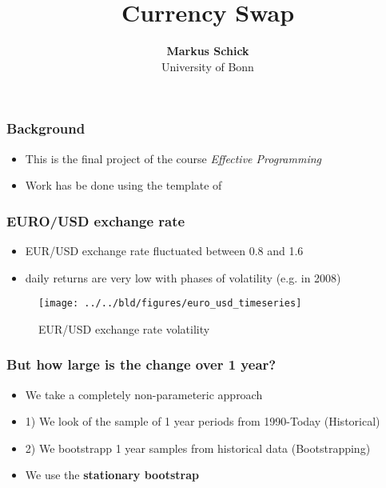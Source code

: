 \documentclass[11pt]{beamer}
\begin{document}
\title{Currency Swap}

\author[Markus Schick]
{
{\bf Markus Schick}\\
{\small University of Bonn}\\[1ex]
}


\begin{frame}
    \titlepage
    \note{~}
\end{frame}

\begin{frame}[t]
    \frametitle{Background}
    \begin{itemize}
        \item This is the final project of the course \textit{Effective Programming}
        \item Work has be done using the template of \citet{GaudeckerEconProjectTemplates}
    \end{itemize}
    \note{~}
\end{frame}



\begin{frame}[t]
    \frametitle{EURO/USD exchange rate}
    \begin{itemize}
        \item EUR/USD exchange rate fluctuated between 0.8 and 1.6
        \item daily returns are very low with phases of volatility (e.g. in 2008)
    \end{itemize}
    \begin{figure}
        \caption{EUR/USD exchange rate volatility}
        \texttt{[image: ../../bld/figures/euro\_usd\_timeseries]}
    \end{figure}
    \note{~}
\end{frame}

\begin{frame}[t]
    \frametitle{But how large is the change over 1 year?}
    \begin{itemize}
        \item We take a completely non-parameteric approach
        \item 1) We look of the sample of 1 year periods from 1990-Today (Historical)
        \item 2) We bootstrapp 1 year samples from historical data (Bootstrapping)
        \item We use the \bf{stationary bootstrap}
    \end{itemize}
    \note{~}
\end{frame}
\end{document}
